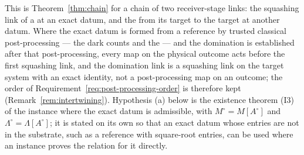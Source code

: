 
This is Theorem~\ref{thm:chain} for a chain of two receiver-stage links: the
squashing link of a  at an exact datum, and the
 from its target to the target at another datum. Where the
exact datum is formed from a reference by trusted classical post-processing
--- the dark counts and the  --- and the domination is
established after that post-processing, every map
on the physical outcome acts before the first squashing link, and the
domination link is a squashing link on the target system with an exact
identity, not a post-processing map on an outcome; the order of
Requirement~\ref{req:post-processing-order} is therefore kept
(Remark~\ref{rem:intertwining}). Hypothesis (a) below is the existence
theorem (I3) of the instance where the exact datum is admissible, with
$M^{\circ}=M[A^{\circ}]$ and $\Lambda^{\circ}=\Lambda[A^{\circ}]$; it is
stated on its own so that an exact datum whose entries are not in the
substrate, such as a reference with square-root entries, can be used where an
instance proves the relation for it directly.

